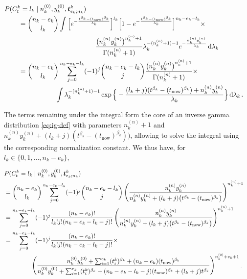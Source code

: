 \documentclass[Journal,SectionNumbers,InsideFigs]{ascelike}
\newcommand{\dd}{\,\mathrm{d}}
\renewcommand{\vec}[1]{{\bm#1}}
\newcommand{\uz}{^{(0)}} %
\newcommand{\un}{^{(n)}} %
\def\ykz{y\uz_k}
\def\ykn{y\un_k}
\def\nkz{n\uz_k}
\def\nkn{n\un_k}
\def\tnow{t_\text{now}}
\begin{document}
\begin{linenomath*}
\begin{align}
\lefteqn{P(C^k_t = l_k\mid\nkz,\ykz, \vec{t}^k_{e_k;n_k})}\hspace*{5ex} \nonumber\\
 &= { n_k - e_k \choose l_k} \int \Big[    e^{-\frac{t^{\beta_k} - (\tnow)^{\beta_k}}{\lambda_k}}\Big]^{l_k}
                                  \Big[1 - e^{-\frac{t^{\beta_k} - (\tnow)^{\beta_k}}{\lambda_k}}\Big]^{n_k - e_k - l_k}
    \times \nonumber\\ & \hspace*{27ex}
    \frac{\big(\nkn\ykn\big)^{\nkn + 1}}{\Gamma(\nkn+1)} \lambda_k^{-(\nkn + 1) - 1} e^{-\frac{\nkn\ykn}{\lambda_k}} \dd \lambda_k \nonumber\\
 &= { n_k - e_k \choose l_k} \sum_{j=0}^{n_k-e_k-l_k} (-1)^j { n_k - e_k - l_k \choose j} \frac{\big(\nkn\ykn\big)^{\nkn + 1}}{\Gamma(\nkn+1)} 
    \times \nonumber\\ & \hspace*{13ex}
    \int \lambda_k^{-(\nkn + 1) - 1} \exp\Big\{-\frac{(l_k + j) (t^{\beta_k} - (\tnow)^{\beta_k}) + \nkn\ykn}{\lambda_k}\Big\} \dd \lambda_k\,.
\end{align}
\end{linenomath*}
%
The terms remaining under the integral form the core of an inverse gamma distribution \eqref{eq:ig-def}
with parameters $\nkn + 1$ and $\nkn\ykn + (l_k + j) (t^{\beta_k} - (\tnow)^{\beta_k}))$,
allowing to solve the integral using the corresponding normalization constant.
We thus have, for $l_k \in \{0,1,\ldots,n_k-e_k\}$,
\begin{linenomath*}
\begin{align}
\lefteqn{P(C^k_t = l_k\mid\nkz,\ykz, \vec{t}^k_{e_k;n_k})} \nonumber\\
 &= { n_k - e_k \choose l_k} \sum_{j=0}^{n_k-e_k-l_k} (-1)^j { n_k - e_k - l_k \choose j}
    \left(\frac{\nkn\ykn}{\nkn\ykn + (l_k + j) \big(t^{\beta_k} - (\tnow)^{\beta_k}\big)}\right)^{\nkn + 1} \nonumber\\
 &= \sum_{j=0}^{n_k-e_k-l_k} (-1)^j \frac{(n_k - e_k)!}{l_k! j! (n_k - e_k - l_k - j)!}   
    \left(\frac{\nkn\ykn}{\nkn\ykn + (l_k + j) \big(t^{\beta_k} - (\tnow)^{\beta_k}\big)}\right)^{\nkn + 1} \nonumber\\
 &= \sum_{j=0}^{n_k-e_k-l_k} (-1)^j \frac{(n_k - e_k)!}{l_k! j! (n_k - e_k - l_k - j)!} \times \nonumber\\ & \hspace*{10ex}  
    \left(\frac{\nkz\ykz + \sum_{i=1}^{e_k} (t_i^k)^{\beta_k} + (n_k-e_k)       (\tnow)^{\beta_k} }%
               {\nkz\ykz + \sum_{i=1}^{e_k} (t_i^k)^{\beta_k} + (n_k-e_k-l_k-j) (\tnow)^{\beta_k} + (l_k + j) t^{\beta_k} }\right)^{%
    \nkz + e_k + 1}.
\label{eq:postpred-priorparams}
\end{align}
\end{linenomath*}
\end{document}
